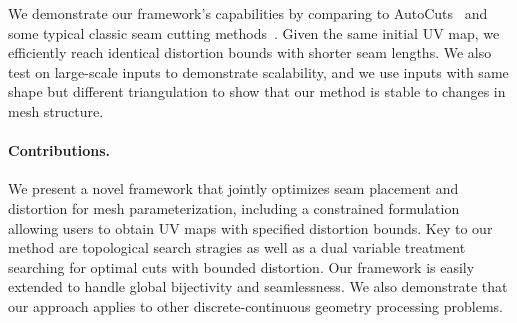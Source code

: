 We demonstrate our framework's capabilities by comparing to AutoCuts~\cite{Poranne2017Autocuts} and some typical classic seam cutting methods~\cite{Gu2002Geometry,Sheffer2002Seamster}. %
Given the same initial UV map, we efficiently reach identical distortion bounds with shorter seam lengths. We also test on large-scale inputs to demonstrate scalability, and we use inputs with same shape but different triangulation to show that our method is stable to changes in mesh structure.
%

\paragraph*{Contributions.} 
We present a novel framework that jointly optimizes seam placement and distortion for mesh parameterization, including a constrained formulation allowing users to obtain UV maps with specified distortion bounds. Key to our method are topological search stragies as well as a dual variable treatment searching for optimal cuts with bounded distortion. Our framework is easily extended to handle global bijectivity and seamlessness.  We also demonstrate that our approach applies to other discrete-continuous geometry processing problems.%
